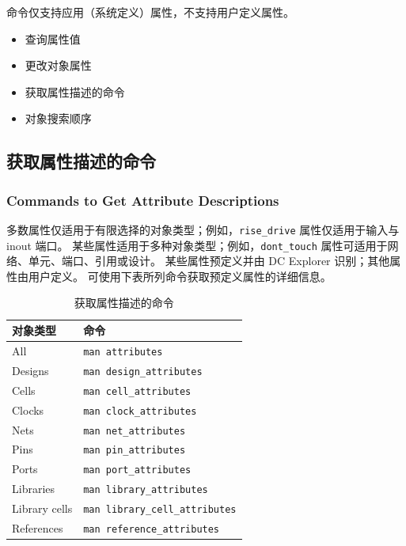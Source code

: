 \begin{noteBox}
 命令仅支持应用（系统定义）属性，不支持用户定义属性。
\end{noteBox}

\begin{seeAlsoBox}
\begin{itemize}
  \item 查询属性值
  \item 更改对象属性
  \item 获取属性描述的命令
  \item 对象搜索顺序
\end{itemize}
\end{seeAlsoBox}

\subsection{获取属性描述的命令}
\subsubsection*{Commands to Get Attribute Descriptions}

多数属性仅适用于有限选择的对象类型；例如，\texttt{rise\_drive} 属性仅适用于输入与 inout 端口。
某些属性适用于多种对象类型；例如，\texttt{dont\_touch} 属性可适用于网络、单元、端口、引用或设计。
某些属性预定义并由 DC Explorer 识别；其他属性由用户定义。
可使用下表所列命令获取预定义属性的详细信息。

\begin{table}[htbp]
\centering
\caption{获取属性描述的命令}
\label{tab:dce-attr-desc}
\begin{tabular}{@{}ll@{}}
\toprule
对象类型 & 命令 \\
\midrule
All & \texttt{man attributes} \\
Designs & \texttt{man design\_attributes} \\
Cells & \texttt{man cell\_attributes} \\
Clocks & \texttt{man clock\_attributes} \\
Nets & \texttt{man net\_attributes} \\
Pins & \texttt{man pin\_attributes} \\
Ports & \texttt{man port\_attributes} \\
Libraries & \texttt{man library\_attributes} \\
Library cells & \texttt{man library\_cell\_attributes} \\
References & \texttt{man reference\_attributes} \\
\bottomrule
\end{tabular}
\end{table}

